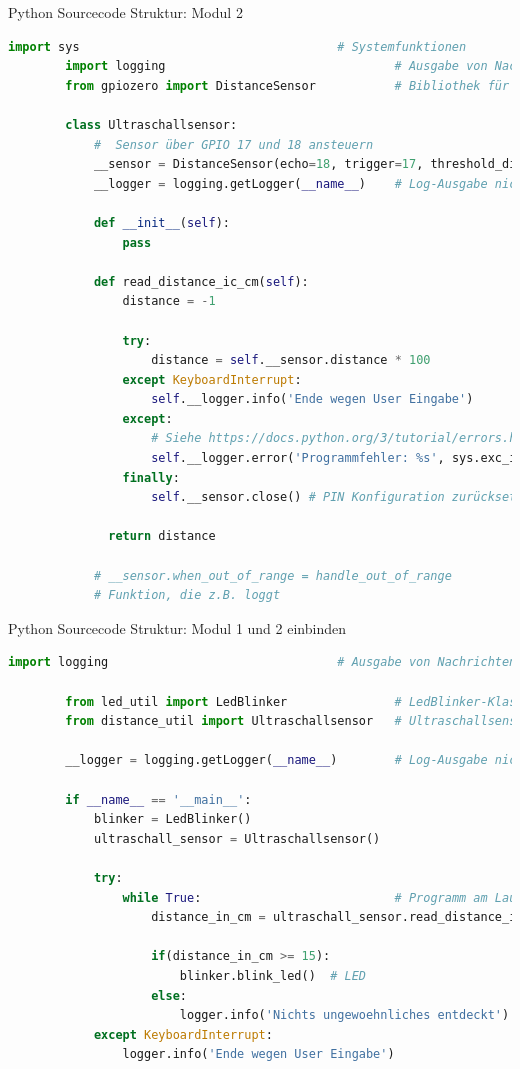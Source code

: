 \begin{frame}[fragile]{Python Sourcecode Struktur: Modul 2}
    \begin{lstlisting}[language=Python, gobble=8]
        import sys                                    # Systemfunktionen
        import logging                                # Ausgabe von Nachrichten+
        from gpiozero import DistanceSensor           # Bibliothek für Ultraschallsensor

        class Ultraschallsensor:
            #  Sensor über GPIO 17 und 18 ansteuern
            __sensor = DistanceSensor(echo=18, trigger=17, threshold_distance = 0.1, max_distance=1)
            __logger = logging.getLogger(__name__)    # Log-Ausgabe nicht mit print()

            def __init__(self):
                pass

            def read_distance_ic_cm(self):
                distance = -1

                try:
                    distance = self.__sensor.distance * 100
                except KeyboardInterrupt:
                    self.__logger.info('Ende wegen User Eingabe')
                except:
                    # Siehe https://docs.python.org/3/tutorial/errors.html
                    self.__logger.error('Programmfehler: %s', sys.exc_info()[0])
                finally:
                    self.__sensor.close() # PIN Konfiguration zurücksetzen

              return distance

            # __sensor.when_out_of_range = handle_out_of_range
            # Funktion, die z.B. loggt
    \end{lstlisting}
\end{frame}

\begin{frame}[fragile]{Python Sourcecode Struktur: Modul 1  und 2 einbinden}
    \begin{lstlisting}[language=Python, gobble=8]
        import logging                                # Ausgabe von Nachrichten

        from led_util import LedBlinker               # LedBlinker-Klasse
        from distance_util import Ultraschallsensor   # Ultraschallsensor-Klasse

        __logger = logging.getLogger(__name__)        # Log-Ausgabe nicht mit print()

        if __name__ == '__main__':
            blinker = LedBlinker()
            ultraschall_sensor = Ultraschallsensor()

            try:
                while True:                           # Programm am Laufen halten
                    distance_in_cm = ultraschall_sensor.read_distance_in_cm()

                    if(distance_in_cm >= 15):
                        blinker.blink_led()  # LED
                    else:
                        logger.info('Nichts ungewoehnliches entdeckt')
            except KeyboardInterrupt:
                logger.info('Ende wegen User Eingabe')
    \end{lstlisting}
\end{frame}
